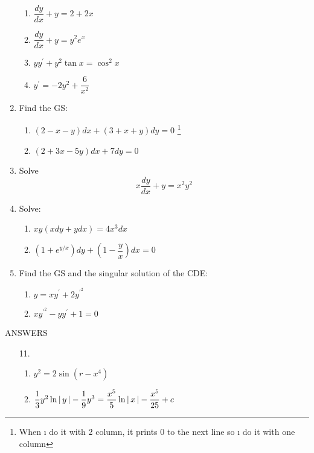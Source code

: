 \documentclass[11pt]{article}
\begin{document}
\begin{enumerate}
\begin{multicols}{2}
\begin{enumerate}[label=\alph*)]
                \item $\dfrac{dy}{dx} + y = 2 + 2x$
                \item $\dfrac{dy}{dx} + y = y^2 e^x$
                \item $yy^\prime + y^2 \tan x = \cos^2x$
                \item $y^\prime = -2y^2 + \dfrac{6}{x^2}\qquad $ 
            \end{enumerate}
        \end{multicols}
    \item Find the GS:
            \begin{enumerate}[label=\alph*)]
                \item $(2-x-y)dx + (3+x+y)dy= 0 $
                \footnote{When ı do it with 2 column, it prints 0 to the next line so ı do it with one column}
                \item $(2+3x-5y)dx + 7dy = 0$
            \end{enumerate}
    \item Solve
    \[
    x \dfrac{dy}{dx} + y = x^2 y^2
    \]
    \item Solve:
        \begin{enumerate}[label=\alph*)]
            \item $xy(xdy + ydx) = 4x^3dx$
            \item $(1+ e^{y/x})dy + (1- \dfrac{y}{x})dx = 0 $ 
        \end{enumerate}
    \item Find the GS and the singular solution of the CDE:
        \begin{multicols}{2}
            \begin{enumerate}[label=\alph*)]
                \item $y = x y^\prime + 2 y^{\prime^{2}} $
                \item $xy^{\prime^{2}} - yy^\prime + 1 = 0$
            \end{enumerate}
        \end{multicols}        
\end{enumerate}

\centering ANSWERS
\begin{enumerate}
    \item[11.] \begin{enumerate}[label=\alph*)]
        \item $y^2 = 2 \sin(r-x^4)$
        \item $\dfrac{1}{3}y^2 \ln \left \lvert \, y \, \right \rvert - \dfrac{1}{9} y^3 = \dfrac{x^5}{5} \ln \left \lvert \, x \, \right \rvert - \dfrac{x^5}{25} +c $
    \end{enumerate}
\end{enumerate}
\end{document}
